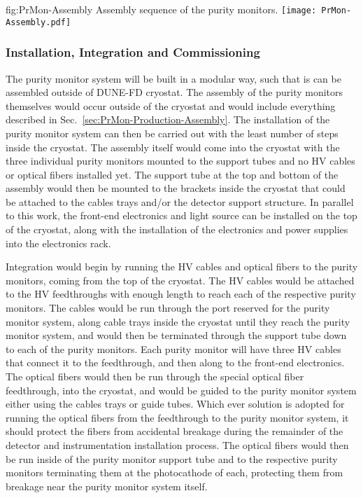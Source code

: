 \begin{dunefigure}{fig:PrMon-Assembly}
  {Assembly sequence of the purity monitors.}
  \texttt{[image: PrMon-Assembly.pdf]}
\end{dunefigure}


\subsubsection{Installation, Integration and Commissioning}
\label{sec:PrMon-Install-Integrate-Commission}
The purity monitor system will be built in a modular way, such that is can be assembled outside of DUNE-FD cryostat.  The assembly of the purity monitors themselves would occur outside of the cryostat and would include everything described in Sec.~\ref{sec:PrMon-Production-Assembly}.  The installation of the purity monitor system can then be carried out with the least number of steps inside the cryostat.  The assembly itself would come into the cryostat with the three individual purity monitors mounted to the support tubes and no HV cables or optical fibers installed yet.  The support tube at the top and bottom of the assembly would then be mounted to the brackets inside the cryostat that could be attached to the cables trays and/or the detector support structure.  In parallel to this work, the front-end electronics and light source can be installed on the top of the cryostat, along with the installation of the electronics and power supplies into the electronics rack.  

Integration would begin by running the HV cables and optical fibers to the purity monitors, coming from the top of the cryostat.  The HV cables would be attached to the HV feedthroughs with enough length to reach each of the respective purity monitors.  The cables would be run through the port reserved for the purity monitor system, along cable trays inside the cryostat until they reach the purity monitor system, and would then be terminated through the support tube down to each of the purity monitors.  Each purity monitor will have three HV cables that connect it to the feedthrough, and then along to the front-end electronics.  The optical fibers would then be run through the special optical fiber feedthrough, into the cryostat, and would be guided to the purity monitor system either using the cables trays or guide tubes.  Which ever solution is adopted for running the optical fibers from the feedthrough to the purity monitor system, it should protect the fibers from accidental breakage during the remainder of the detector and instrumentation installation process.  The optical fibers would then be run inside of the purity monitor support tube and to the respective purity monitors terminating them at the photocathode of each, protecting them from breakage near the purity monitor system itself.

